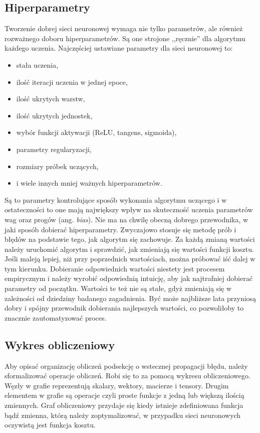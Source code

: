 \documentclass[12pt,a4paper,twoside,titlepage,openright]{book}
\begin{document}
\subsection{Hiperparametry}
Tworzenie dobrej sieci neuronowej wymaga nie tylko parametrów, ale również rozważnego doboru hiperparametrów. Są one strojone ,,ręcznie'' dla algorytmu każdego uczenia. Najczęściej ustawiane parametry dla sieci neuronowej to:
\begin{itemize}
\item stała uczenia,
\item ilość iteracji uczenia w jednej epoce,
\item ilość ukrytych warstw,
\item ilość ukrytych jednostek,
\item wybór funkcji aktywacji (ReLU, tangens, sigmoida),
\item parametry regularyzacji,
\item rozmiary próbek uczących,
\item i wiele innych mniej ważnych hiperparametrów.
\end{itemize}

Są to parametry kontrolujące sposób wykonania algorytmu uczącego i w ostateczności to one mają największy wpływ na skuteczność uczenia parametrów wag oraz progów (ang. \textit{bias}). Nie ma na chwilę obecną dobrego przewodnika, w jaki sposób dobierać hiperparametry. Zwyczajowo stosuje się metodę prób i błędów na podstawie tego, jak algorytm się zachowuje. \cite{sitefastAI} Za każdą zmianą wartości należy uruchomić algorytm i sprawdzić, jak zmieniają się wartości funkcji kosztu. Jeśli maleją lepiej, niż przy poprzednich wartościach, można próbować iść dalej w tym kierunku. Dobieranie odpowiednich wartości niestety jest procesem empirycznym i należy wyrobić odpowiednią intuicję, aby jak najtrafniej dobierać parametry od początku. Wartości te też nie są stałe, gdyż zmieniają się w zależności od dziedziny badanego zagadnienia. Być może najbliższe lata przyniosą dobry i spójny przewodnik dobierania najlepszych wartości, co pozwoliłoby to znacznie zautomatyzować proces.

\subsection{Wykres obliczeniowy}
Aby opisać organizację obliczeń podsekcję o wstecznej propagacji błędu, należy sformalizować operacje obliczeń. Robi się to za pomocą wykresu obliczeniowego. Węzły w grafie reprezentują skalary, wektory, macierze i tensory. Drugim elementem w grafie są operacje czyli proste funkcje z jedną lub większą ilością zmiennych. Graf obliczeniowy przydaje się kiedy istnieje zdefiniowana funkcja bądź zmienna, którą należy zoptymalizować, w przypadku sieci neuronowych oczywistą jest funkcja kosztu.
\end{document}
